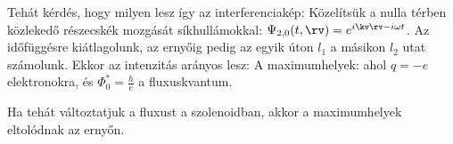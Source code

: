    Tehát kérdés, hogy milyen lesz így az interferenciakép:
   Közelítsük a nulla térben közlekedő részecskék mozgását síkhullámokkal: $\Psi_{2,0}(t,\rv)=e^{i\kv\rv-i\omega t}$.
   Az időfüggésre kiátlagolunk, az ernyőig pedig az egyik úton $l_1$ a másikon $l_2$ utat számolunk.
   Ekkor az intenzitás arányos lesz:
   A maximumhelyek:
   ahol $q=-e$ elektronokra, és $\Phi_0^*=\frac{h}{e}$ a fluxuskvantum.
   
   Ha tehát változtatjuk a fluxust a szolenoidban, akkor a maximumhelyek eltolódnak az ernyőn. 
